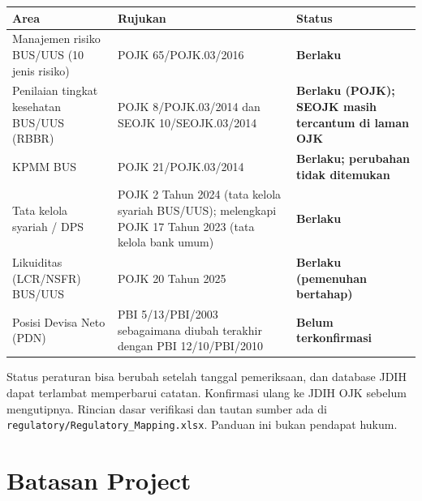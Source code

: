 \documentclass[11pt,a4paper]{article}
\newcommand{\file}[1]{\texttt{\small #1}}
\begin{document}
\begin{longtable}{>{\raggedright\arraybackslash}p{3.6cm}>{\raggedright\arraybackslash}p{5.2cm}>{\raggedright\arraybackslash}p{5.9cm}}
\toprule
\textbf{Area} & \textbf{Rujukan} & \textbf{Status} \\
\midrule
\endhead
Manajemen risiko BUS/UUS (10 jenis risiko) & POJK 65/POJK.03/2016 & \textbf{Berlaku} \\
Penilaian tingkat kesehatan BUS/UUS (RBBR) & POJK 8/POJK.03/2014 dan SEOJK 10/SEOJK.03/2014 & \textbf{Berlaku (POJK); SEOJK masih tercantum di laman OJK} \\
KPMM BUS & POJK 21/POJK.03/2014 & \textbf{Berlaku; perubahan tidak ditemukan} \\
Tata kelola syariah / DPS & POJK 2 Tahun 2024 (tata kelola syariah BUS/UUS); melengkapi POJK 17 Tahun 2023 (tata kelola bank umum) & \textbf{Berlaku} \\
Likuiditas (LCR/NSFR) BUS/UUS & POJK 20 Tahun 2025 & \textbf{Berlaku (pemenuhan bertahap)} \\
Posisi Devisa Neto (PDN) & PBI 5/13/PBI/2003 sebagaimana diubah terakhir dengan PBI 12/10/PBI/2010 & \textbf{Belum terkonfirmasi} \\
\bottomrule
\end{longtable}

\begin{warnbox}
Status peraturan bisa berubah setelah tanggal pemeriksaan, dan database JDIH dapat terlambat memperbarui catatan. Konfirmasi ulang ke JDIH OJK sebelum mengutipnya. Rincian dasar verifikasi dan tautan sumber ada di \file{regulatory/Regulatory\_\allowbreak{}Mapping.xlsx}. Panduan ini bukan pendapat hukum.
\end{warnbox}
\section{Batasan Project}\label{sec:batasan}
\end{document}
